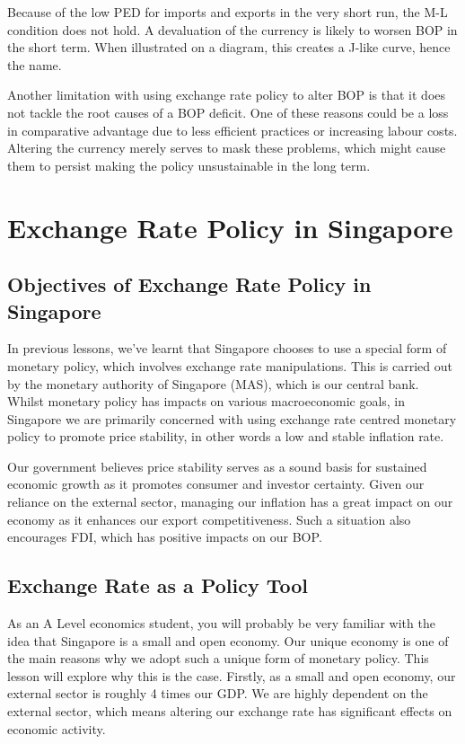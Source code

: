 Because of the low PED for imports and exports in the very short run, the M-L condition does not hold. A devaluation of the currency is likely to worsen BOP in the short term. When illustrated on a diagram, this creates a J-like curve, hence the name.

Another limitation with using exchange rate policy to alter BOP is that it does not tackle the root causes of a BOP deficit. One of these reasons could be a loss in comparative advantage due to less efficient practices or increasing labour costs. Altering the currency merely serves to mask these problems, which might cause them to persist making the policy unsustainable in the long term.
\section{Exchange Rate Policy in Singapore}
\subsection{Objectives of Exchange Rate Policy in Singapore}
In previous lessons, we've learnt that Singapore chooses to use a special form of monetary policy, which involves exchange rate manipulations. This is carried out by the monetary authority of Singapore (MAS), which is our central bank. Whilst monetary policy has impacts on various macroeconomic goals, in Singapore we are primarily concerned with using exchange rate centred monetary policy to promote price stability, in other words a low and stable inflation rate.

Our government believes price stability serves as a sound basis for sustained economic growth as it promotes consumer and investor certainty. Given our reliance on the external sector, managing our inflation has a great impact on our economy as it enhances our export competitiveness. Such a situation also encourages FDI, which has positive impacts on our BOP.
\subsection{Exchange Rate as a Policy Tool}
As an A Level economics student, you will probably be very familiar with the idea that Singapore is a small and open economy. Our unique economy is one of the main reasons why we adopt such a unique form of monetary policy. This lesson will explore why this is the case.
Firstly, as a small and open economy, our external sector is roughly 4 times our GDP. We are highly dependent on the external sector, which means altering our exchange rate has significant effects on economic activity.

